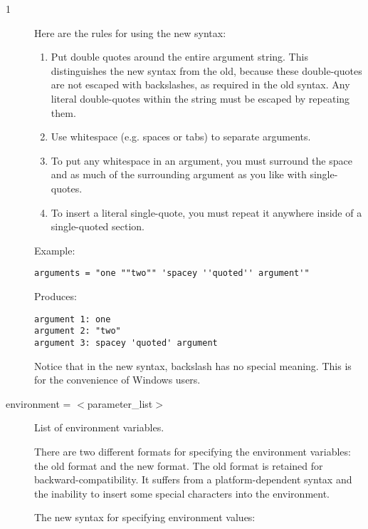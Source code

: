 \begin{ManPage}{\label{man-condor-submit}}{1}
\begin{description}
Here are the rules for using the new syntax:

\begin{enumerate}

\item Put double quotes around the entire argument string.  This
distinguishes the new syntax from the old, because these double-quotes
are not escaped with backslashes, as required in the old syntax.  Any
literal double-quotes within the string must be escaped by repeating
them.

\item Use whitespace (e.g. spaces or tabs) to separate arguments.

\item To put any whitespace in an argument, you must surround the
space and as much of the surrounding argument as you like with
single-quotes.

\item To insert a literal single-quote, you must repeat it anywhere
inside of a single-quoted section.

\end{enumerate}

Example:

\begin{verbatim}
arguments = "one ""two"" 'spacey ''quoted'' argument'"
\end{verbatim}

Produces:

\begin{verbatim}
argument 1: one
argument 2: "two"
argument 3: spacey 'quoted' argument
\end{verbatim}

Notice that in the new syntax, backslash has no special meaning.  This
is for the convenience of Windows users.


\item[environment = $<$parameter\_list$>$] List of environment
\label{man-condor-submit-environment}
variables.

There are two different formats for specifying the environment
variables: the old format and the new format.  The old format is
retained for backward-compatibility.  It suffers from a
platform-dependent syntax and the inability to insert some special
characters into the environment.

The new syntax for specifying environment values:


\end{description}
\end{ManPage}
